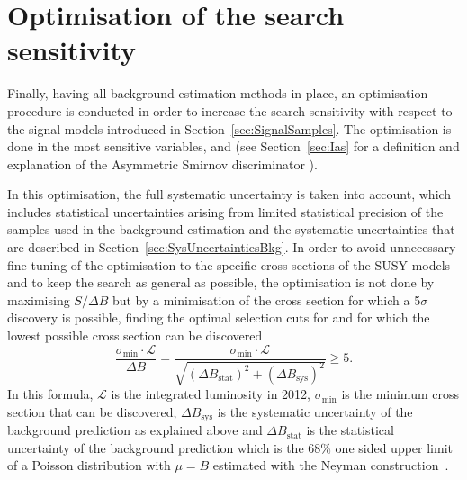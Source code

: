 \FloatBarrier
\chapter{Optimisation of the search sensitivity}
\label{sec:Optimisation}
Finally, having all background estimation methods in place, an optimisation procedure is conducted in order to increase the search sensitivity with respect to the signal models introduced in Section~\ref{sec:SignalSamples}.
The optimisation is done in the most sensitive variables, \pt and \ias (see Section~\ref{sec:Ias} for a definition and explanation of the Asymmetric Smirnov discriminator \ias).

In this optimisation, the full systematic uncertainty is taken into account, which includes statistical uncertainties arising from limited statistical precision of the samples used in the background estimation and the systematic uncertainties that are described in Section~\ref{sec:SysUncertaintiesBkg}.
In order to avoid unnecessary fine-tuning of the optimisation to the specific cross sections of the SUSY models and to keep the search as general as possible, 
the optimisation is not done by maximising  $S/\Delta B$ but by a minimisation of the cross section for which a 5$\sigma$ discovery is possible, \ie finding the optimal selection cuts for \pt and \ias for which the lowest possible cross section can be discovered
\begin{equation}
\label{eq:optimisation}
\frac{\sigma_{\text{min}}\cdot \mathcal{L}}{\Delta B} = \frac{\sigma_{\text{min}}\cdot \mathcal{L}}{\sqrt{ \left(\Delta B_{\text{stat}}\right)^2 + \left(\Delta B_{\text{sys}}\right)^2}} \geq 5.
\end{equation} 
In this formula, $\mathcal{L}$ is the integrated luminosity in 2012, $\sigma_{\text{min}}$ is the minimum cross section that can be discovered, $\Delta B_{\text{sys}}$ is the systematic uncertainty of the background prediction as explained above and 
$\Delta B_{\text{stat}}$ is the statistical uncertainty of the background prediction which is the 68\% one sided upper limit of a Poisson distribution with $\mu = B$ estimated with the 
Neyman construction~\cite{bib:Neyman_1937,bib:PDG_2014}.\\

